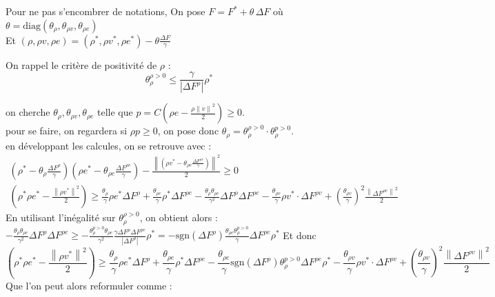 \documentclass[16pt]{article}%
\begin{document}
Pour ne pas s'encombrer de notations, On pose $F = F^* + \theta \, \Delta F$ où $\theta = \text{diag}(\theta_\rho, \theta_{\rho v}, \theta_{\rho e})$  \\
Et $(\rho, \rho v, \rho e) =  (\rho^*, \rho v^*, \rho e^*)- \theta \frac{\Delta F}{\gamma} $ 

On rappel le critère de positivité de $\rho$ : 
\begin{equation}
\theta^{\rho>0}_{\rho} \leq \frac{\gamma}{|\Delta F^{\rho}|} \rho^*
\end{equation}

on cherche $\theta_\rho, \theta_{\rho v}, \theta_{\rho e}$ telle que $p = C (\rho e - \frac{\rho \left\|v\right\|^2}{2}) \geq 0$. \\
pour se faire, on regardera si $\rho p \geq 0$, on pose donc $\theta_{\rho} = \theta^{\rho >0}_{\rho} \cdot \theta^{p>0}_{\rho}$. \\

en développant les calcules, on se retrouve avec : 
\begin{align*}
(\rho^* - \theta_{\rho}\frac{\Delta F^{\rho}}{\gamma})(\rho e^* - \theta_{\rho e}\frac{\Delta F^{\rho e}}{\gamma}) -  \frac{\left\|(\rho v^* - \theta_{\rho v}\frac{\Delta F^{\rho v}}{\gamma})\right\|^2}{2} \geq 0  \\
(\rho^* \rho e^* - \frac{\left\|\rho v^*\right\|^2}{2}) \geq
  \frac{\theta_{\rho  }}{\gamma} \rho e^* \Delta F^{\rho} 
+ \frac{\theta_{\rho e}}{\gamma} \rho^* \Delta F^{\rho e}
- \frac{\theta_{\rho} \theta_{\rho e}}{\gamma^2} \Delta F^{\rho} \Delta F^{\rho e}
- \frac{\theta_{\rho v}}{\gamma} \rho v^* \cdot \Delta F^{\rho v}
+(\frac{\theta_{\rho v}}{\gamma})^2 \frac{\left\|\Delta F^{\rho v}\right\|^2}{2} 
\end{align*}
En utilisant l'inégalité sur $\theta^{\rho >0}_{\rho}$, on obtient alors : 
$- \frac{\theta_{\rho} \theta_{\rho e}}{\gamma^2} \Delta F^{\rho} \Delta F^{\rho e} \geq 
 - \frac{\theta_{\rho}^{p>0} \theta_{\rho e}}{\gamma^2} \frac{\gamma \Delta F^{\rho} \Delta F^{\rho e}}{|\Delta F^\rho |} \rho^* = - \text{sgn}(\Delta F^{\rho}) \frac{\theta_{\rho e} \theta^{p>0}_{\rho}}{\gamma} \Delta F^{\rho e} \rho^* $
Et donc
\begin{equation}
    (\rho^* \rho e^* - \frac{\left\|\rho v^*\right\|^2}{2}) \geq
  \frac{\theta_{\rho  }}{\gamma} \rho e^* \Delta F^{\rho} 
+ \frac{\theta_{\rho e}}{\gamma} \rho^* \Delta F^{\rho e}
- \frac{\theta_{\rho e}}{\gamma} \text{sgn}(\Delta F^{\rho}) \theta^{p>0}_{\rho} \Delta F^{\rho e} \rho^*
- \frac{\theta_{\rho v}}{\gamma} \rho v^* \cdot \Delta F^{\rho v}
+(\frac{\theta_{\rho v}}{\gamma})^2 \frac{\left\|\Delta F^{\rho v}\right\|^2}{2} 
\end{equation}
Que l'on peut alors reformuler comme : 
\end{document}
